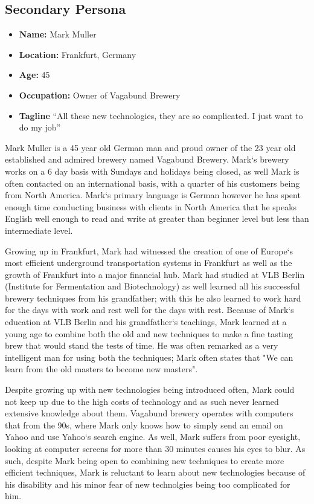 \documentclass{sigchi}
\begin{document}
\subsection{Secondary Persona}
\begin{itemize}
	\item \textbf{Name:} Mark Muller
	\item \textbf{Location:} Frankfurt, Germany
	\item \textbf{Age:} 45 
	\item \textbf{Occupation:} Owner of Vagabund Brewery
	\item \textbf{Tagline} ``All these new technologies, they are so complicated. I just want to do my job''
\end{itemize}

Mark Muller is a 45 year old German man and proud owner of the 23 year old established and admired brewery named Vagabund Brewery. Mark`s brewery works on a 6 day basis with Sundays and holidays being closed, as well Mark is often contacted on an international basis, with a quarter of his customers being from North America. Mark`s primary language is German however he has spent enough time conducting business with clients in North America that he speaks English well enough to read and write at greater than beginner level but less than intermediate level. 

Growing up in Frankfurt, Mark had witnessed the creation of one of Europe`s most efficient underground transportation systems in Frankfurt as well as the growth of Frankfurt into a major financial hub. Mark had studied at VLB Berlin (Institute for Fermentation and Biotechnology) as well learned all his successful brewery techniques from his grandfather; with this he also learned to work hard for the days with work and rest well for the days with rest. Because of Mark`s education at VLB Berlin and his grandfather`s teachings, Mark learned at a young age to combine both the old and new techniques to make a fine tasting brew that would stand the tests of time. He was often remarked as a very intelligent man for using both the techniques; Mark often states that "We can learn from the old masters to become new masters".

Despite growing up with new technologies being introduced often, Mark could not keep up due to the high costs of technology and as such never learned extensive knowledge about them. Vagabund brewery operates with computers that from the 90s, where Mark only knows how to simply send an email on Yahoo and use Yahoo`s search engine. As well, Mark suffers from poor eyesight, looking at computer screens for more than 30 minutes causes his eyes to blur. As such, despite Mark being open to combining new techniques to create more efficient techniques, Mark is reluctant to learn about new technologies because of his disability and his minor fear of new technolgies being too complicated for him.
\end{document}

